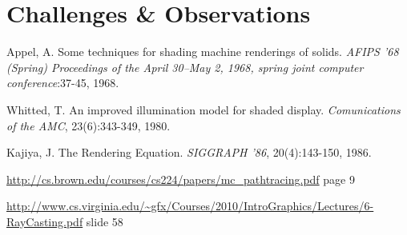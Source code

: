 \documentclass[journal]{IEEEtran}
\begin{document}
\section{Challenges \& Observations}



\begin{thebibliography}{4}

Appel, A. Some techniques for shading machine renderings of solids. \emph{AFIPS '68 (Spring) Proceedings of the April 30--May 2, 1968, spring joint computer conference}:37-45, 1968.

Whitted, T. An improved illumination model for shaded display. \emph{Comunications of the AMC}, 23(6):343-349, 1980.

Kajiya, J. The Rendering Equation. \emph{SIGGRAPH '86}, 20(4):143-150, 1986.

\url{http://cs.brown.edu/courses/cs224/papers/mc_pathtracing.pdf} page 9

\url{http://www.cs.virginia.edu/~gfx/Courses/2010/IntroGraphics/Lectures/6-RayCasting.pdf} slide 58


\end{thebibliography}

\end{document}
